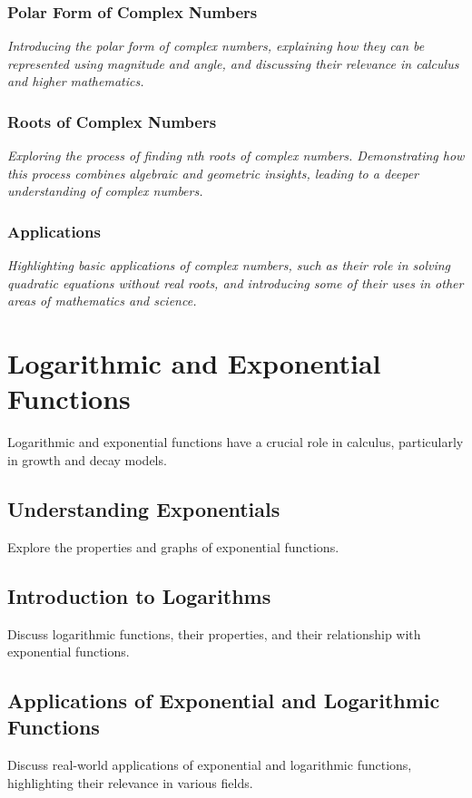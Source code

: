 \documentclass[a4paper,12pt]{book}
\begin{document}
\subsubsection{Polar Form of Complex Numbers}
\textit{Introducing the polar form of complex numbers, explaining how they can be represented using magnitude and angle, and discussing their relevance in calculus and higher mathematics.}


\subsubsection{Roots of Complex Numbers}
\textit{Exploring the process of finding nth roots of complex numbers. Demonstrating how this process combines algebraic and geometric insights, leading to a deeper understanding of complex numbers.}


\subsubsection{Applications}
\textit{Highlighting basic applications of complex numbers, such as their role in solving quadratic equations without real roots, and introducing some of their uses in other areas of mathematics and science.}


\section{Logarithmic and Exponential Functions}
\label{sec:logarithmic_exponential}
Logarithmic and exponential functions have a crucial role in calculus, particularly in growth and decay models.


\subsection{Understanding Exponentials}
\label{subsec:understanding_exponentials}
Explore the properties and graphs of exponential functions.


\subsection{Introduction to Logarithms}
\label{subsec:introduction_to_logarithms}
Discuss logarithmic functions, their properties, and their relationship with exponential functions.


\subsection{Applications of Exponential and Logarithmic Functions}
\label{subsec:applications_exp_log_functions}
Discuss real-world applications of exponential and logarithmic functions, highlighting their relevance in various fields.
\end{document}
